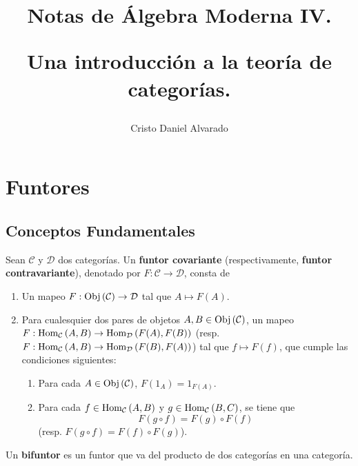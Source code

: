 \documentclass[12pt]{report}
\newcounter{it}
\theoremstyle{largebreak}
\newcommand\cf[3]{\ensuremath{#1:#2\rightarrow#3}}
\newcommand{\Obj}[1]{\ensuremath{\textup{Obj}\left(#1\right)}}
\newcommand{\Hom}[3]{\ensuremath{\textup{Hom}_{#1}\left(#2,#3\right)}}
\begin{document}
    \setlength{\parskip}{5pt} %
    \setlength{\parindent}{12pt} %
    \title{Notas de Álgebra Moderna IV.
    
    Una introducción a la teoría de categorías.}
    \author{Cristo Daniel Alvarado}
    \maketitle

    \tableofcontents %

    \setcounter{chapter}{2} %
    
    \chapter{Funtores}

    \section{Conceptos Fundamentales}
    
    \begin{mydef}
        Sean $\mathcal{C}$ y $\mathcal{D}$ dos categorías. Un \textbf{funtor covariante} (respectivamente, \textbf{funtor contravariante}), denotado por $\cf{F}{\mathcal{C}}{\mathcal{D}}$, consta de
        \begin{enumerate}
            \item Un mapeo $\cf{F}{\Obj{\mathcal{C}}}{\mathcal{D}}$ tal que $A\mapsto F(A)$.
            \item Para cualesquier dos pares de objetos $A,B\in\Obj{\mathcal{C}}$, un mapeo $\cf{F}{\Hom{\mathcal{C}}{A}{B}}{\Hom{\mathcal{D}}{F(A)}{F(B)}}$ (resp. $\cf{F}{\Hom{\mathcal{C}}{A}{B}}{\Hom{\mathcal{D}}{F(B)}{F(A)}}$) tal que $f\mapsto F(f)$, que cumple las condiciones siguientes:
            \begin{enumerate}
                \item Para cada $A\in\Obj{\mathcal{C}}$, $F(1_A)=1_{F(A)}$.
                \item Para cada $f\in\Hom{\mathcal{C}}{A}{B}$ y $g\in\Hom{\mathcal{C}}{B}{C}$, se tiene que
                \begin{equation*}
                    F(g\circ f)=F(g)\circ F(f)
                \end{equation*}
                (resp. $F(g\circ f)=F(f)\circ F(g)$).
            \end{enumerate}
        \end{enumerate}
        Un \textbf{bifuntor} es un funtor que va del producto de dos categorías en una categoría.
    \end{mydef}
\end{document}
